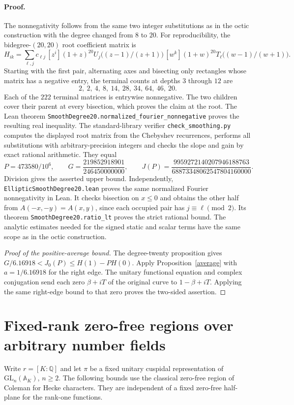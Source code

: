 \documentclass[11pt]{article}
\begin{document}
\paragraph{Proof.}
The nonnegativity follows from the same two integer substitutions as in the octic construction with the degree changed from $8$ to $20$. For reproducibility, the bidegree-$(20,20)$ root coefficient matrix is
\[
 H_{ik}=\sum_{\ell,j}c_{\ell j}\,[z^i](1+z)^{20}
 U_j\bigl((z-1)/(z+1)\bigr)\,[w^k](1+w)^{20}
 T_\ell\bigl((w-1)/(w+1)\bigr).
\]
Starting with the first pair, alternating axes and bisecting only rectangles whose matrix has a negative entry, the terminal counts at depths $3$ through $12$ are
\[
 2,\ 2,\ 4,\ 8,\ 14,\ 28,\ 34,\ 64,\ 46,\ 20.
\]
Each of the $222$ terminal matrices is entrywise nonnegative. The two children cover their parent at every bisection, which proves the claim at the root. The Lean theorem \texttt{SmoothDegree20.normalized\_fourier\_nonnegative} proves the resulting real inequality. The standard-library verifier \texttt{check\_smoothing.py} computes the displayed root matrix from the Chebyshev recurrences, performs all substitutions with arbitrary-precision integers and checks the slope and gain by exact rational arithmetic. They equal
\[
 P=473580/10^6,\qquad
 G=\frac{219852918901}{246450000000},\qquad
 J(P)=\frac{9959272140207946188763}{68873348062547804160000}.
\]
Division gives the asserted upper bound. Independently, \texttt{EllipticSmoothDegree20.lean} proves the same normalized Fourier nonnegativity in Lean. It checks bisection on $x\le0$ and obtains the other half from $A(-x,-y)=A(x,y)$, since each occupied pair has $j\equiv\ell\pmod2$. Its theorem \texttt{SmoothDegree20.ratio\_lt} proves the strict rational bound. The analytic estimates needed for the signed static and scalar terms have the same scope as in the octic construction.


\begin{proof}[Proof of the positive-average bound]
The degree-twenty proposition gives $G/6.16918<J_0(P)\le H(1)-PH(0)$. Apply Proposition~\ref{average} with $a=1/6.16918$ for the right edge. The unitary functional equation and complex conjugation send each zero $\beta+iT$ of the original curve to $1-\beta+iT$. Applying the same right-edge bound to that zero proves the two-sided assertion.
\end{proof}


\section{Fixed-rank zero-free regions over arbitrary number fields}\label{rb:section}
Write $r=[K:\mathbb Q]$ and let $\pi$ be a fixed unitary cuspidal representation of $\mathrm{GL}_n(\mathbb A_K)$, $n\ge2$. The following bounds use the classical zero-free region of Coleman for Hecke characters. They are independent of a fixed zero-free half-plane for the rank-one functions.
\end{document}
